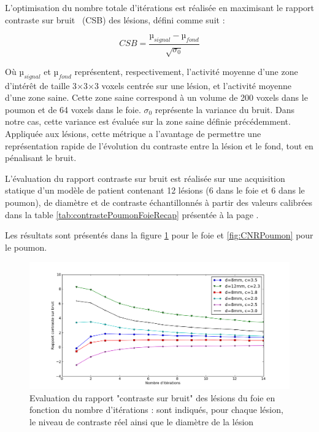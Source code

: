 L'optimisation du nombre totale d'itérations est réalisée en maximisant le rapport contraste sur bruit~\cite{takahara2004diffusion} (CSB) des lésions, défini comme suit :

\begin{equation}
 CSB = \frac{µ_{signal} - µ_{fond}}{\sqrt{\sigma_0}}
\end{equation}

Où $µ_{signal}$ et $µ_{fond}$ représentent, respectivement, l'activité moyenne d'une zone d'intérêt de taille 3$\times$3$\times$3 voxels centrée sur une lésion, et l'activité moyenne d'une zone saine. Cette zone saine correspond à un volume de 200 voxels dans le poumon et de 64 voxels dans le foie. $\sigma_0$ représente la variance du bruit. Dans notre cas, cette variance est évaluée sur la zone saine définie précédemment. Appliquée aux lésions, cette métrique a l'avantage de permettre une représentation rapide de l'évolution du contraste entre la lésion et le fond, tout en pénalisant le bruit.

L'évaluation du rapport contraste sur bruit est réalisée sur une acquisition statique d'un modèle de patient contenant 12 lésions (6 dans le foie et 6 dans le poumon), de diamètre et de contraste échantillonnés à partir des valeurs calibrées dans la table \ref{tab:contrastePoumonFoieRecap} présentée à la page \pageref{tab:contrastePoumonFoieRecap}.

Les résultats sont présentés dans la figure \ref{fig:CNRFoie} pour le foie et \ref{fig:CNRPoumon} pour le poumon.

\begin{figure}
\centering
\includegraphics[width=17cm]{images/CNRFoie}
\caption[Evaluation du rapport contraste sur bruit des lésions du foie en fonction du nombre d'itérations]{Evaluation du rapport "contraste sur bruit" des lésions du foie en fonction du nombre d'itérations : sont indiqués, pour chaque lésion, le niveau de contraste réel ainsi que le diamètre de la lésion}
\label{fig:CNRFoie}
\end{figure}


